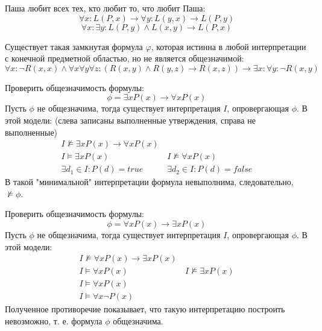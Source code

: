 \documentclass[11pt]{article}
\begin{document}
Паша любит всех тех, кто любит то, что любит Паша:
\begin{equation*}
\forall x: L(P, x) \to \forall y: L(y, x) \to L(P, y)
\end{equation*}
\begin{equation*}
\forall x: \exists y: L(P, y) \land L(x, y) \to L(P, x)
\end{equation*}

Существует такая замкнутая формула $\varphi$, которая истинна в любой интерпретации с конечной предметной областью, но не является общезначимой:
\begin{equation*}
\forall x: \lnot R(x, x) \land \forall x\forall y\forall z: (R(x, y) \land R(y, z) \to R(x, z)) \to \exists x: \forall y: \lnot R(x, y)
\end{equation*}

Проверить общезначимость формулы:
\begin{equation*}
\phi = \exists x P(x) \to \forall x P(x)
\end{equation*}
Пусть $\phi$ не общезначима, тогда существует интерпретация $I$, опровергающая $\phi$. В этой модели: (слева записаны выполненные утверждения, справа не выполненные)
\begin{align*}
I \not\models \exists x P(x) \to \forall x P(x) \\
I \models \exists x P(x) &\, I \not\models \forall x P(x) \\
\exists d_1 \in I: P(d) = true &\, \exists d_2 \in I: P(d) = false
\end{align*}
В такой "минимальной" интерпретации формула невыполнима, следовательно, $\not\models \phi$.

Проверить общезначимость формулы:
\begin{equation*}
\phi = \forall x P(x) \to \exists x P(x)
\end{equation*}
Пусть $\phi$ не общезначима, тогда существует интерпретация $I$, опровергающая $\phi$. В этой модели:
\begin{align*}
I \not\models \forall x P(x) \to \exists x P(x) \\
I \models \forall x P(x) &\, I \not\models \exists x P(x) \\
I \models \forall x P(x) \\
I \models \forall x \neg P(x)
\end{align*}
Полученное противоречие показывает, что такую интерпретацию построить невозможно, т. е. формула $\phi$ общезначима.
\end{document}
